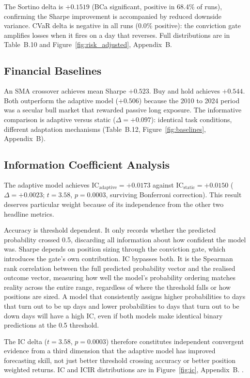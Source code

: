 The Sortino delta is $+0.1519$ (BCa significant, positive in 68.4\% of runs), confirming the Sharpe improvement is accompanied by reduced downside variance. CVaR delta is negative in all runs (0.0\% positive): the conviction gate amplifies losses when it fires on a day that reverses. Full distributions are in Table~B.10 and Figure~\ref{fig:risk_adjusted}, Appendix~B.

\subsection{Financial Baselines}
\label{subsec:baselines}

An SMA crossover achieves mean Sharpe $+0.523$. Buy and hold achieves $+0.544$. Both outperform the adaptive model ($+0.506$) because the 2010 to 2024 period was a secular bull market that rewarded passive long exposure. The informative comparison is adaptive versus static ($\Delta{=}{+}0.097$): identical task conditions, different adaptation mechanisms (Table~B.12, Figure~\ref{fig:baselines}, Appendix~B).

\subsection{Information Coefficient Analysis}
\label{subsec:ic}

The adaptive model achieves $\text{IC}_{\text{adaptive}}{=}{+}0.0173$ against $\text{IC}_{\text{static}}{=}{+}0.0150$ ($\Delta{=}{+}0.0023$; $t{=}3.58$, $p{=}0.0003$, surviving Bonferroni correction). This result deserves particular weight because of its independence from the other two headline metrics.

Accuracy is threshold dependent. It only records whether the predicted probability crossed 0.5, discarding all information about how confident the model was. Sharpe depends on position sizing through the conviction gate, which introduces the gate's own contribution. IC bypasses both. It is the Spearman rank correlation between the full predicted probability vector and the realised outcome vector, measuring how well the model's probability ordering matches reality across the entire range, regardless of where the threshold falls or how positions are sized. A model that consistently assigns higher probabilities to days that turn out to be up days and lower probabilities to days that turn out to be down days will have a high IC, even if both models make identical binary predictions at the 0.5 threshold.

The IC delta ($t{=}3.58$, $p{=}0.0003$) therefore constitutes independent convergent evidence from a third dimension that the adaptive model has improved forecasting skill, not just better threshold crossing accuracy or better position weighted returns. IC and ICIR distributions are in Figure~\ref{fig:ic}, Appendix~B. .

